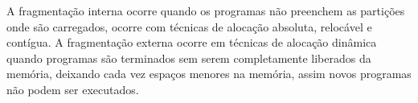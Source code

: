 
A fragmentação interna ocorre quando os programas não preenchem as partições
onde são carregados, ocorre com técnicas de alocação absoluta, relocável e 
contígua.
A fragmentação externa ocorre em técnicas de alocação dinâmica quando
programas são terminados sem serem completamente liberados da memória, deixando
cada vez espaços menores na memória, assim novos programas não podem ser executados.

